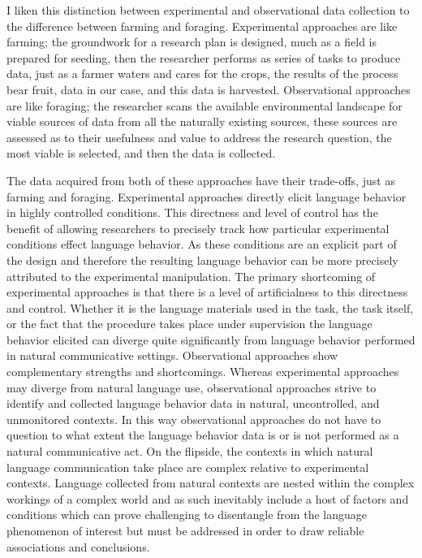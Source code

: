 \documentclass[
  letterpaper,
]{scrbook}
\begin{document}
I liken this distinction between experimental and observational data
collection to the difference between farming and foraging. Experimental
approaches are like farming; the groundwork for a research plan is
designed, much as a field is prepared for seeding, then the researcher
performs as series of tasks to produce data, just as a farmer waters and
cares for the crops, the results of the process bear fruit, data in our
case, and this data is harvested. Observational approaches are like
foraging; the researcher scans the available environmental landscape for
viable sources of data from all the naturally existing sources, these
sources are assessed as to their usefulness and value to address the
research question, the most viable is selected, and then the data is
collected.

The data acquired from both of these approaches have their trade-offs,
just as farming and foraging. Experimental approaches directly elicit
language behavior in highly controlled conditions. This directness and
level of control has the benefit of allowing researchers to precisely
track how particular experimental conditions effect language behavior.
As these conditions are an explicit part of the design and therefore the
resulting language behavior can be more precisely attributed to the
experimental manipulation. The primary shortcoming of experimental
approaches is that there is a level of artificialness to this directness
and control. Whether it is the language materials used in the task, the
task itself, or the fact that the procedure takes place under
supervision the language behavior elicited can diverge quite
significantly from language behavior performed in natural communicative
settings. Observational approaches show complementary strengths and
shortcomings. Whereas experimental approaches may diverge from natural
language use, observational approaches strive to identify and collected
language behavior data in natural, uncontrolled, and unmonitored
contexts. In this way observational approaches do not have to question
to what extent the language behavior data is or is not performed as a
natural communicative act. On the flipside, the contexts in which
natural language communication take place are complex relative to
experimental contexts. Language collected from natural contexts are
nested within the complex workings of a complex world and as such
inevitably include a host of factors and conditions which can prove
challenging to disentangle from the language phenomenon of interest but
must be addressed in order to draw reliable associations and
conclusions.
\end{document}
